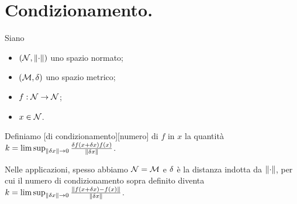\section{Condizionamento.}
\label{AnalisiDegliErrori_Condizionamento.}
\begin{Definition}
  Siano
  \begin{itemize}
    \item $(\NormedSpace,\Norm{\cdot})$ uno spazio normato;
    \item $(\mathcal{M},\delta)$ uno spazio metrico;
    \item $f: \mathcal{N} \rightarrow \mathcal{N}$;
    \item $x \in \mathcal{N}$.
  \end{itemize}
  Definiamo
  [di condizionamento][numero]
  di $f$ in $x$ la quantit\`a
  $\ConditionNumber
  = \limsup_{\Norm{\delta x} \rightarrow 0}
    \frac{\Distance{f(x + \delta x)}{f(x)}}{\Norm{\delta x}}$.
\end{Definition}
\par Nelle applicazioni, spesso abbiamo $\mathcal{N} = \mathcal{M}$ e
$\delta$ \`e la distanza indotta da $\Norm{\cdot}$, per cui il numero di
condizionamento sopra definito diventa
$\ConditionNumber
= \limsup_{\Norm{\delta x} \rightarrow 0}
  \frac{\Norm{f(x + \delta x) - f(x)}}{\Norm{\delta x}}$.
